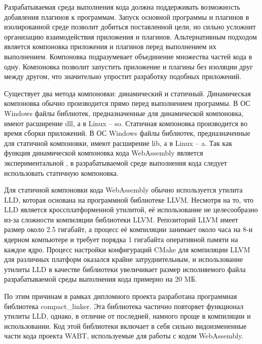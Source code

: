 Разрабатываемая среда выполнения кода должна поддерживать возможность добавления плагинов к программам.
Запуск основной программы и плагинов в изолированной среде позволит добиться поставленной цели, но сильно усложнит организацию взаимодействия приложения и плагинов.
Альтернативным подходом является компоновка приложения и плагинов перед выполнением их выполнением.
Компоновка подразумевает объединение множества частей кода в одну.
Компоновка позволит запустить приложение и плагины без изоляции друг между другом, что значительно упростит разработку подобных приложений.

Существует два метода компоновки: динамический и статичный.
Динамическая компоновка обычно производится прямо перед выполнением программы.
В ОС Windows файлы библиотек, предназначенные для динамической компоновка, имеют расширение dll, а в Linux -- so.
Статичная компоновка производится во время сборки приложений.
В ОС Windows файлы библиотек, предназначенные для статичной компоновки, имеют расширение lib, а в Linux -- a.
Так как функция динамической компоновка кода WebAssembly является экспериментальной \cite{WASMDynamicLinking}, в разрабатываемой среде выполнения кода следует использовать статичную компоновка.

Для статичной компоновки кода WebAssembly обычно используется утилита LLD, которая основана на программной библиотеке LLVM.
Несмотря на то, что LLD является кроссплатформенной утилитой, её использование не целесообразно из-за сложности компиляции библиотеки LLVM.
Репозиторий LLVM имеет размер около 2.5 гигабайт, а процесс её компиляции занимает около часа на 8-и ядерном компьютере и требует порядка 1 гигабайта оперативной памяти на каждое ядро.
Процесс настройки конфигураций CMake для компиляции LLVM для различных платформ оказался крайне затруднительным, и использование утилиты LLD в качестве библиотеки увеличивает размер исполняемого файла разрабатываемой среды выполнения кода примерно на 20 MБ.

По этим причинам в рамках дипломного проекта разработана программная библиотека compact\_linker. 
Эта библиотека частично повторяет функционал утилиты LLD, однако, в отличие от последней, намного проще в компиляции и использовании.
Код этой библиотеки включает в себя сильно видоизмененные части кода проекта WABT, используемые для работы с кодом WebAssembly.
